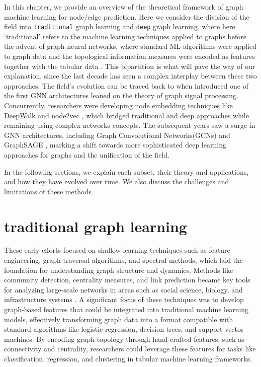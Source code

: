 In this chapter, we provide an overview of the theoretical framework of graph machine learning for node/edge prediction. Here we consider the division of the field into \texttt{traditional} graph learning and \texttt{deep} graph learning, where here `traditional' refers to the machine learning techniques applied to graphs before the advent of graph neural networks, where standard ML algorithms were applied to graph data and the topological information measures were encoded as features together with the tabular data  \cite{costa2007characterization, silva2016machine}. This bipartition is what will pave the way of our explanation, since the last decade has seen a complex interplay between these two approaches. The field's evolution can be traced back to when  introduced one of the first GNN architectures leaned on the theory of graph signal processing. Concurrently, researchers were developing node embedding techniques like DeepWalk \cite{perozzi2014deepwalk} and node2vec \cite{grover2016node2vec}, which bridged traditional and deep approaches while remaining using complex networks concepts. The subsequent years saw a surge in GNN architectures, including Graph Convolutional Networks(GCNs) \cite{kipf2016semi} and GraphSAGE \cite{hamilton2017inductive}, marking a shift towards more sophisticated deep learning approaches for graphs and the unification of the field.  

In the following sections, we explain each subset, their theory and applications, and how they have evolved over time. We also discuss the challenges and limitations of these methods.

\section{traditional graph learning}

\label{classical_learning}

These early efforts focused on shallow learning techniques such as feature engineering, graph traversal algorithms, and spectral methods, which laid the foundation for understanding graph structure and dynamics. Methods like community detection, centrality measures, and link prediction \cite{silva2016machine} became key tools for analyzing large-scale networks in areas such as social science, biology, and infrastructure systems \cite{newman2018networks,boccaletti2006complex}. A significant focus of these techniques was to develop graph-based features that could be integrated into traditional machine learning models, effectively transforming graph data into a format compatible with standard algorithms like logistic regression, decision trees, and support vector machines. By encoding graph topology through hand-crafted features, such as connectivity and centrality, researchers could leverage these features for tasks like classification, regression, and clustering in tabular machine learning frameworks.

